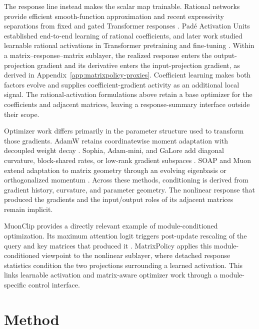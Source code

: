 \documentclass{article}
\begin{document}
The response line instead makes the scalar map trainable.  Rational networks
provide efficient smooth-function approximation and recent expressivity
separations from fixed and gated Transformer responses
\citep{boulle2020rational,tang2026rationalexpressivity}.  Pad\'e Activation Units
established end-to-end learning of rational coefficients, and later work studied
learnable rational activations in Transformer pretraining and fine-tuning
\citep{molina2020pade,fang2023transformers}.  Within a
matrix--response--matrix sublayer, the realized response enters the
output-projection gradient and its derivative enters the input-projection
gradient, as derived in Appendix~\ref{app:matrixpolicy-proxies}.  Coefficient
learning makes both factors evolve and supplies coefficient-gradient activity as
an additional local signal.  The rational-activation formulations above retain a
base optimizer for the coefficients and adjacent matrices, leaving a
response-summary interface outside their scope.

Optimizer work differs primarily in the parameter structure used to transform
those gradients.  AdamW retains coordinatewise moment adaptation with decoupled
weight decay \citep{loshchilov2019decoupled}.  Sophia, Adam-mini, and GaLore add
diagonal curvature, block-shared rates, or low-rank gradient subspaces
\citep{liu2024sophia,zhang2025adammini,zhao2024galore}.  SOAP and Muon extend
adaptation to matrix geometry through an evolving eigenbasis or orthogonalized
momentum \citep{vyas2025soap,liu2025muon}.  Across these methods, conditioning is
derived from gradient history, curvature, and parameter geometry.  The
nonlinear response that produced the gradients and the input/output roles of its
adjacent matrices remain implicit.

MuonClip provides a directly relevant example of module-conditioned
optimization.  Its maximum attention logit triggers post-update rescaling of the
query and key matrices that produced it \citep{kimiteam2025kimik2}.  MatrixPolicy
applies this module-conditioned viewpoint to the nonlinear sublayer, where
detached response statistics condition the two projections surrounding a learned
activation.  This links learnable activation and matrix-aware optimizer work
through a module-specific control interface.

\section{Method}
\label{sec:method}
\end{document}
